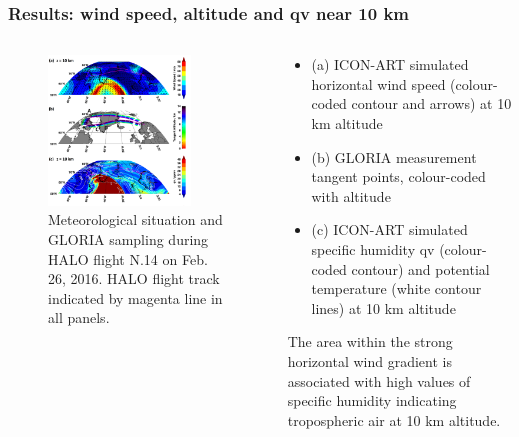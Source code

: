\documentclass[18pt]{beamer}
\begin{document}
	
	\begin{frame}
	\frametitle{Results: wind speed, altitude and qv near 10 km}
	
	\begin{columns}
		\begin{block}{}
			\begin{figure}
				\centering
				\includegraphics[width=0.8\textwidth]{polarpic1.png}
				\caption{\scriptsize {Meteorological situation and GLORIA sampling during HALO flight N.14 on Feb. 26, 2016. HALO flight track indicated by magenta line in all panels.}
				}
			\end{figure}
		\end{block}
		\column{.5\textwidth}
		\begin{block}{}
			\begin{itemize}
				\item \small{(a) ICON-ART simulated horizontal wind speed (colour-coded contour and arrows) at 10 km altitude }
				\item \small{(b) GLORIA measurement tangent points, colour-coded with altitude}
				\item \small{(c) ICON-ART simulated specific humidity qv (colour-coded contour) and potential temperature (white contour lines) at 10 km altitude}
			\end{itemize}
		The area within the strong horizontal wind gradient is associated with high values of specific humidity indicating tropospheric air at 10 km altitude.  
		\end{block}
	\end{columns}
	
	\end{frame}
\end{document}
